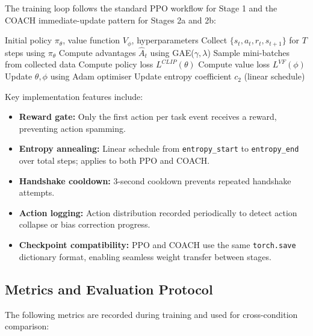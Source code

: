 \documentclass[../report.tex]{subfiles}
\begin{document}
    The training loop follows the standard PPO workflow for Stage 1 and the COACH immediate-update pattern for Stages 2a and 2b:

    \begin{algorithm}[H]
        \caption{PPO Training Loop (Stage 1)}
        \label{alg:ppo}
        \begin{algorithmic}[1]
            \Require Initial policy $\pi_\theta$, value function $V_\phi$, hyperparameters
                \State Collect $\{s_t, a_t, r_t, s_{t+1}\}$ for $T$ steps using $\pi_\theta$
                \State Compute advantages $\hat{A}_t$ using GAE($\gamma, \lambda$)
                    \State Sample mini-batches from collected data
                    \State Compute policy loss $L^{CLIP}(\theta)$
                    \State Compute value loss $L^{VF}(\phi)$
                    \State Update $\theta, \phi$ using Adam optimiser
                \EndFor
                \State Update entropy coefficient $c_2$ (linear schedule)
            \EndFor
        \end{algorithmic}
    \end{algorithm}

    Key implementation features include:
    \begin{itemize}
        \item \textbf{Reward gate:} Only the first action per task event receives a reward, preventing action spamming.
        \item \textbf{Entropy annealing:} Linear schedule from \texttt{entropy\_start} to \texttt{entropy\_end} over total steps; applies to both PPO and COACH.
        \item \textbf{Handshake cooldown:} 3-second cooldown prevents repeated handshake attempts.
        \item \textbf{Action logging:} Action distribution recorded periodically to detect action collapse or bias correction progress.
        \item \textbf{Checkpoint compatibility:} PPO and COACH use the same \texttt{torch.save} dictionary format, enabling seamless weight transfer between stages.
    \end{itemize}

    \subsection{Metrics and Evaluation Protocol}

    The following metrics are recorded during training and used for cross-condition comparison:
\end{document}
